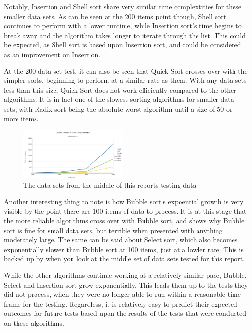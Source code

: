 \documentclass{acm_proc_article-sp}
\begin{document}
Notably, Insertion and Shell sort share very similar time complextities for these smaller 
data sets. As can be seen at the 200 items point though, Shell sort continues
to perform with a lower runtime, while Insertion sort's time begins to break away and 
the algorithm takes longer to iterate through the list. This could be expected, as Shell
sort is based upon Insertion sort, and could be considered as an improvement on Insertion.

At the 200 data set test, it can also be seen that Quick Sort crosses over with the simpler
sorts, beginning to perform at a similar rate as them. With any data sets less than this size,
Quick Sort does not work efficiently compared to the other algorithms. It is in fact one of the 
slowest sorting algorithms for smaller data sets, with Radix sort being the absolute worst 
algorithm until a size of 50 or more items.

\begin{figure}[h]
\centering
\includegraphics[width=0.48\textwidth]{img/graph_middle.png}
\caption{The data sets from the middle of this reports testing data}
\end{figure}

Another interesting thing to note is how Bubble sort's expoential growth is very visible by
the point there are 100 items of data to process. It is at this stage that the more reliable
algorithms cross over with Bubble sort, and shows why Bubble sort is fine for small data
sets, but terrible when presented with anything moderately large. The same can be said about
Select sort, which also becomes exponentially slower than Bubble sort at 100 items, just
at a lowler rate. This is backed up by when you look at the middle set of data sets tested
for this report.

While the other algorithms continue working at a relatively similar pace, Bubble, Select
and Insertion sort grow exponentially. This leads them up to the tests they did not process, when they were
no longer able to run within a reasonable time frame for the testing. Regardless, it is
relatively easy to predict their expected outcomes for future tests based upon the 
results of the tests that were conducted on these algorithms.
\end{document}
